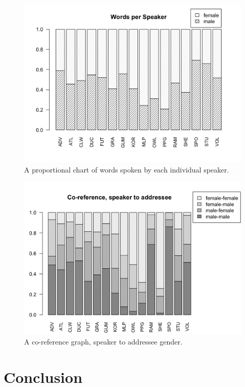 \documentclass[a4paper, 11pt]{article}
\begin{document}
\begin{figure}[t!]
  \includegraphics[width=\linewidth]{figures/worperspk.png}
  \caption{A proportional chart of words spoken by each individual speaker.}
  \label{fig:worperspk}
\end{figure}

\begin{figure}[t!]
  \includegraphics[width=\linewidth]{figures/coreference.png}
  \caption{A co-reference graph, speaker to addressee gender.}
  \label{fig:coreference}
\end{figure}

\section{Conclusion}



\end{document}
